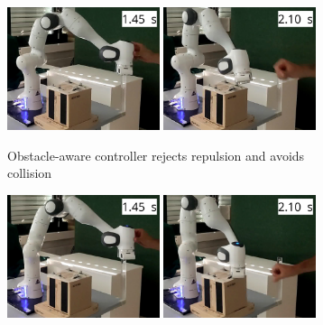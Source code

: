 \begin{figure}
    \centering
   \begin{subfigure}{\columnwidth}
    \includegraphics[width=0.49\textwidth]{figures/franka_sequence/franka_obstacle_aware016}\hfill%
    \includegraphics[width=0.49\textwidth]{figures/franka_sequence/franka_obstacle_aware020}
      \caption{Obstacle-aware controller rejects repulsion and avoids collision}
      \label{fig:franka_sequence_obstacle_aware}
    \end{subfigure}
	\begin{subfigure}{\columnwidth}
    \includegraphics[width=0.49\textwidth]{figures/franka_sequence/franka_velocity_conserving021}\hfill%
    \includegraphics[width=0.49\textwidth]{figures/franka_sequence/franka_velocity_conserving025}\hfill%

\end{subfigure}
\end{figure}
